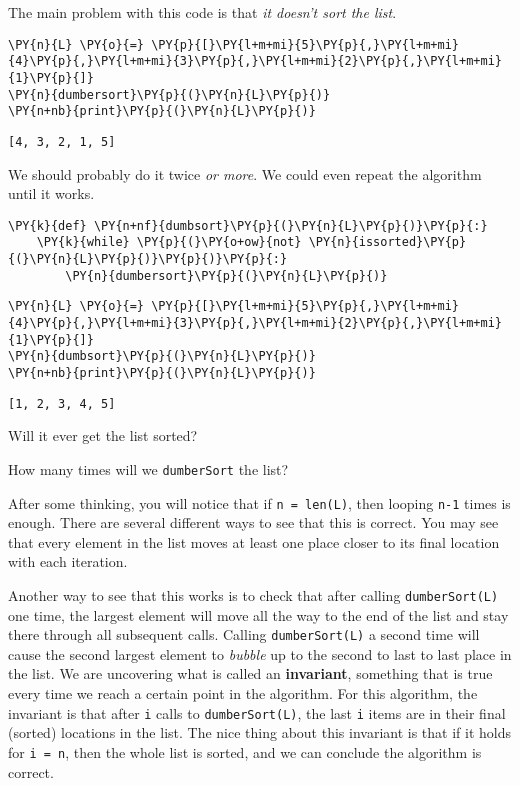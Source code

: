 The main problem with this code is that \emph{it doesn't sort the list}.


\begin{Verbatim}[commandchars=\\\{\}]
\PY{n}{L} \PY{o}{=} \PY{p}{[}\PY{l+m+mi}{5}\PY{p}{,}\PY{l+m+mi}{4}\PY{p}{,}\PY{l+m+mi}{3}\PY{p}{,}\PY{l+m+mi}{2}\PY{p}{,}\PY{l+m+mi}{1}\PY{p}{]}
\PY{n}{dumbersort}\PY{p}{(}\PY{n}{L}\PY{p}{)}
\PY{n+nb}{print}\PY{p}{(}\PY{n}{L}\PY{p}{)}
\end{Verbatim}

\begin{Verbatim}
[4, 3, 2, 1, 5]
\end{Verbatim}


We should probably do it twice \emph{or more}.  We could even repeat the algorithm until it works.

\begin{Verbatim}[commandchars=\\\{\}]
\PY{k}{def} \PY{n+nf}{dumbsort}\PY{p}{(}\PY{n}{L}\PY{p}{)}\PY{p}{:}
    \PY{k}{while} \PY{p}{(}\PY{o+ow}{not} \PY{n}{issorted}\PY{p}{(}\PY{n}{L}\PY{p}{)}\PY{p}{)}\PY{p}{:}
        \PY{n}{dumbersort}\PY{p}{(}\PY{n}{L}\PY{p}{)}
\end{Verbatim}



\begin{Verbatim}[commandchars=\\\{\}]
\PY{n}{L} \PY{o}{=} \PY{p}{[}\PY{l+m+mi}{5}\PY{p}{,}\PY{l+m+mi}{4}\PY{p}{,}\PY{l+m+mi}{3}\PY{p}{,}\PY{l+m+mi}{2}\PY{p}{,}\PY{l+m+mi}{1}\PY{p}{]}
\PY{n}{dumbsort}\PY{p}{(}\PY{n}{L}\PY{p}{)}
\PY{n+nb}{print}\PY{p}{(}\PY{n}{L}\PY{p}{)}
\end{Verbatim}

\begin{Verbatim}
[1, 2, 3, 4, 5]
\end{Verbatim}


Will it ever get the list sorted?  


How many times will we \texttt{dumberSort} the list?


After some thinking, you will notice that if \texttt{n = len(L)}, then looping \texttt{n-1} times is enough.  There are several different ways to see that this is correct.  You may see that every element in the list moves at least one place closer to its final location with each iteration.  


Another way to see that this works is to check that after calling \texttt{dumberSort(L)} one time, the largest element will move all the way to the end of the list and stay there through all subsequent calls.  Calling \texttt{dumberSort(L)} a second time will cause the second largest element to \emph{bubble} up to the second to last to last place in the list.  We are uncovering what is called an \textbf{invariant}, something that is true every time we reach a certain point in the algorithm.  For this algorithm, the invariant is that after \texttt{i} calls to \texttt{dumberSort(L)}, the last \texttt{i} items are in their final (sorted) locations in the list.  The nice thing about this invariant is that if it holds for \texttt{i = n}, then the whole list is sorted, and we can conclude the algorithm is correct.


